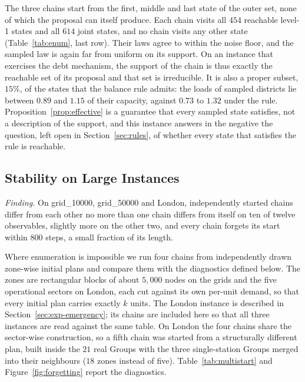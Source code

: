 \documentclass[11pt]{article}
\theoremstyle{definition}
\begin{document}
The three chains start from the first, middle and last state of the outer set, none of which the proposal can itself produce. Each chain visits all $454$ reachable level-1 states and all $614$ joint states, and no chain visits any other state (Table~\ref{tab:enum}, last row). Their laws agree to within the noise floor, and the sampled law is again far from uniform on its support. On an instance that exercises the debt mechanism, the support of the chain is thus exactly the reachable set of its proposal and that set is irreducible. It is also a proper subset, $15\%$, of the states that the balance rule admits: the loads of sampled districts lie between $0.89$ and $1.15$ of their capacity, against $0.73$ to $1.32$ under the rule. Proposition~\ref{prop:effective} is a guarantee that every sampled state satisfies, not a description of the support, and this instance answers in the negative the question, left open in Section~\ref{sec:rules}, of whether every state that satisfies the rule is reachable.

\subsection{Stability on Large Instances}
\label{sec:exp-multistart}

\emph{Finding.} On grid\_10000, grid\_50000 and London, independently started chains differ from each other no more than one chain differs from itself on ten of twelve observables, slightly more on the other two, and every chain forgets its start within $800$ steps, a small fraction of its length.

Where enumeration is impossible we run four chains from independently drawn zone-wise initial plans and compare them with the diagnostics defined below. The zones are rectangular blocks of about $5{,}000$ nodes on the grids and the five operational sectors on London, each cut against its own per-unit demand, so that every initial plan carries exactly $k$ units. The London instance is described in Section~\ref{sec:exp-emergency}; its chains are included here so that all three instances are read against the same table. On London the four chains share the sector-wise construction, so a fifth chain was started from a structurally different plan, built inside the $21$ real Groups with the three single-station Groups merged into their neighbours ($18$ zones instead of five). Table~\ref{tab:multistart} and Figure~\ref{fig:forgetting} report the diagnostics.
\end{document}
